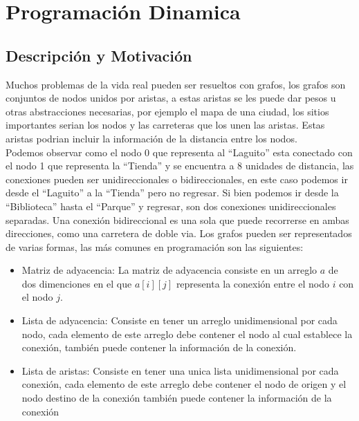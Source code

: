 \chapter{Programación Dinamica}
\section{Descripción y Motivación}

Muchos problemas de la vida real pueden ser resueltos con grafos, los grafos son conjuntos de nodos unidos por aristas, a estas aristas se les puede dar pesos u otras abstracciones necesarias, por ejemplo el mapa de una ciudad, los sitios importantes serian los nodos y las carreteras que los unen las aristas. Estas aristas podrian incluir la información de la distancia entre los nodos.
\\
Podemos observar como el nodo $0$ que representa al ``Laguito'' esta conectado con el nodo 1 que representa la ``Tienda'' y se encuentra a 8 unidades de distancia, las conexiones pueden ser unidireccionales o bidireccionales, en este caso podemos ir desde el ``Laguito'' a la ``Tienda'' pero no regresar. Si bien podemos ir desde la ``Biblioteca'' hasta el ``Parque'' y regresar, son dos conexiones unidireccionales separadas. Una conexión bidireccional es una sola que puede recorrerse en ambas direcciones, como una carretera de doble via.
Los grafos pueden ser representados de varias formas, las más comunes en programación son las siguientes:
\\\begin{minipage}{\textwidth}
\begin{itemize}
\item 
Matriz de adyacencia: La matriz de adyacencia consiste en un arreglo $a$ de dos dimenciones en el que $a[i][j]$ representa la conexión entre el nodo $i$ con el nodo $j$.
\\
\item
Lista de adyacencia: Consiste en tener un arreglo unidimensional por cada nodo, cada elemento de este arreglo debe contener el nodo al cual establece la conexión, también puede contener la información de la conexión.
\\
\item
Lista de aristas: Consiste en tener una unica lista unidimensional por cada conexión, cada elemento de este arreglo debe contener el nodo de origen y el nodo destino de la conexión también puede contener la información de la conexión 
\\
\end{itemize}
\end{minipage}
